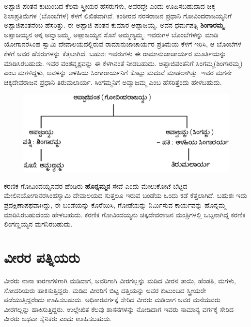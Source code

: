 ಅಪ್ಪಾಜಿ ಪಂತನ ಕುಟುಂಬದ ಕೆಲವು ಸ್ತ್ರೀಯರ ಹೆಸರುಗಳು, ಅವರದ್ದೇ ಎಂದು ಊಹಿಸಬಹುದಾದ ಚಿಕ್ಕ ಶಿಲಾಪ್ರತಿಮೆಗಳ (ಬೊಂಬೆಗಳ) ಕೆಳಗೆ ಲಿಖಿತವಾಗಿವೆ. ಕಂಠೀರವ ನರಸರಾಜನ ಪ್ರಧಾನಿ ಗೋವಿಂದರಾಜಯ್ಯನಿಗೆ ಅಪ್ಪಾಜಿಪಂತನೆಂಬ ಹೆಸರಿತ್ತು. ಈ ಅಪ್ಪಾಜಿ ಪಂತನ ಕುಮಾರ ಅಪ್ಪಾಜಯ್ಯ. ಅವನ ಧರ್ಮಪತ್ನಿ \textbf{ಶಿಂಗಾರಮ್ಮ}. ಅಪ್ಪಾಜಯ್ಯನ ಅಕ್ಕ ಅವ್ವಾಜಮ್ಮ, ಅಪ್ಪಾಜಯ್ಯನ ಸೊಸೆ ಅಮ್ಮಣ್ಯಮ್ಮ. ಇವರುಗಳ ಬೊಂಬೆಗಳನ್ನು ಮಾಡಿ ಯೋಗಾನರಸಿಂಹ ಸ್ವಾಮಿ ದೇವಾಲಯದಲ್ಲಿರುವ ರಾಮಾನುಜಾಚಾರ್ಯರ ಪ್ರತಿಮೆಯ ಕೆಳಗೆ ಇರಿಸಿ, ಆ ಬೊಂಬೆಗಳ ಕೆಳಗೆ ಅವರ ಹೆಸರುಗಳನ್ನು ಕೆತ್ತಲಾಗಿದೆ. ಬಹುಶಃ ಇವರುಗಳು ಈ ರಾಮಾನುಜಾಚಾರ್ಯರ ಮೂರ್ತಿಯನ್ನು ಮಾಡಿಸಿರಬಹುದು. ಇವರ ವಂಶವೃಕ್ಷವನ್ನು ಈ ಕೆಳಗಿನಂತೆ ನೀಡಬಹುದು. ಅಪ್ಪಾಜಿಪಂತನಿಗೆ ಸಿಂಗಮ್ಮ(ಶಿಂಗಾರಮ್ಮ) ಎಂಬ ಮಗಳಿದ್ದಳು, ಅವಳನ್ನು ಅಳಹಿಯ ಸಿಂಗಾರಾರ್ಯನಿಗೆ ಕೊಟ್ಟು ಮದುವೆ ಮಾಡಲಾಗಿತ್ತು. ಇವರ ಮಗನೇ ಚಿಕ್ಕದೇವರಾಜನ ಪ್ರಧಾನಿ ತಿರುಮಲಾರ್ಯ. ಸಿಂಗಮ್ಮನಿಗೆ ಅವ್ವಾಜಮ್ಮ ಎಂಬ ಹೆಸರಿತ್ತೆಂದು ಹೇಳಬಹುದು.

\begin{figure}[!h]
\includegraphics[scale=1.1]{images/chap5/chap5fig1.jpeg}
\end{figure}

ಕರಣಿಕ ಗೋವಿಂದಯ್ಯನವರ ಹೆಂಡಿರು \textbf{ಹೊನ್ನಮ್ಮನ} ಸೇವೆ ಎಂದು ಮೇಲುಕೋಟೆ ಬೆಟ್ಟದ ಮೇಲಿನ\break ಯೋಗಾನರಸಿಂಹಸ್ವಾಮಿ ದೇವಾಲಯದ ಸುತ್ತಲೂ ಇರುವ ಬಂಡೆಯ ಒಂದು ಕಡೆ ಕೆತ್ತಲಾಗಿದೆ. ಬಹುಶಃ ಇದು ಪ್ರದಕ್ಷಿಣಾಪಥವಾಗಿದ್ದು, ಈ ಬಂಡೆಯನ್ನು ಕೊರೆಯಿಸಿ, ಗೋಡೆಯನ್ನು ನಿರ್ಮಿಸುವ ಕಾರ್ಯವನ್ನು ಹೊನ್ನಮ್ಮ ಮಾಡಿಸಿರ\-ಬಹುದೆಂದು ಹೇಳಬಹುದು. ಕರಣಿಕ ಗೋವಿಂದಯ್ಯನು ಚಿಕ್ಕದೇವರಾಜನ ಮಂತ್ರಿಗಳಲ್ಲಿ ಒಬ್ಬನಾಗಿದ್ದ ಕರಣಿಕ ಲಿಂಗಣ್ಣಯ್ಯನ ಮಗನಿರಬಹುದು.

\section*{ವೀರರ ಪತ್ನಿಯರು}

ವೀರರು ನಾನಾ ಕಾರಣಗಳಿಗಾಗಿ ಮಡಿದಾಗ, ಅವರಿಗಾಗಿ ವೀರಗಲ್ಲನ್ನು ಮಡಿದ ವೀರನ ತಾಯಿ, ಹೆಂಡತಿ, ಮಗಳು, ಸೋದರಿಯರು ಹಾಕಿಸುತ್ತಿದ್ದರು. ಮಡಿದ ವೀರರಿಗೆ ಬಿಟ್ಟ ದತ್ತಿಯನ್ನು ಅವರ ಕುಟುಂಬದ ಸ್ತ್ರೀಯರೇ ಪಡೆಯುತ್ತಿದ್ದರೆಂದು ಊಹಿಸಬಹುದು. ಅಧಿಕಾರವರ್ಗಕ್ಕೆ ಸೇರಿದ ವೀರರು ಮಡಿದಾಗ ಅವರ ಮನೆಯವರು ವೀರಗಲ್ಲನ್ನು ಹಾಕಿಸುತ್ತಿದ್ದರು. ಉಲ್ಲೇಖಿತ ಕೆಲವು ಶಾಸನಗಳನ್ನು ನೋಡಿದಾಗ ಇವರು ಸಾಮಾನ್ಯ ವರ್ಗಕ್ಕೆ ಸೇರಿದ ವೀರರು ಅಥವಾ ಸೈನಿಕರು ಎಂದು ಊಹಿಸಬಹುದು.

